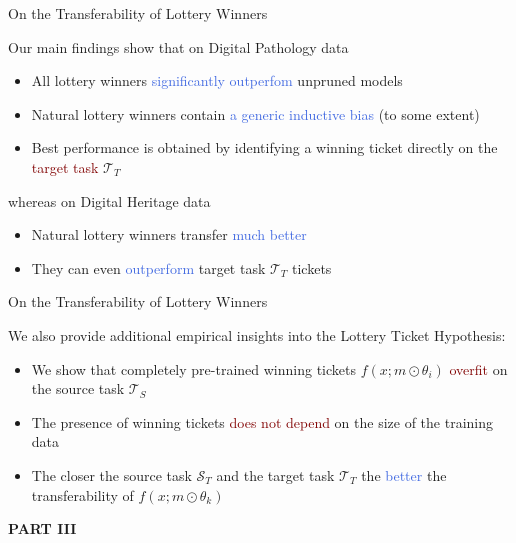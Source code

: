 \documentclass{beamer}
\begin{document}
\begin{frame}{On the Transferability of Lottery Winners}

	Our main findings show that on Digital Pathology data
	\bigskip
	\begin{itemize}
		\item All lottery winners \textcolor{RoyalBlue}{significantly outperfom} unpruned models 
		\item Natural lottery winners contain \textcolor{RoyalBlue}{a generic inductive bias} (to some extent)
		\item Best performance is obtained by identifying a winning ticket directly on the \textcolor{Maroon}{target task} $\mathcal{T}_T$
	\end{itemize}
	\bigskip

	whereas on Digital Heritage data
	\bigskip
	\begin{itemize}
		\item Natural lottery winners transfer \textcolor{RoyalBlue}{much better}
		\item They can even \textcolor{RoyalBlue}{outperform} target task $\mathcal{T}_T$ tickets
	\end{itemize}
\end{frame}

\begin{frame}{On the Transferability of Lottery Winners}
	
	We also provide additional empirical insights into the Lottery Ticket Hypothesis:
	\bigskip
	\begin{itemize}
		\item We show that completely pre-trained winning tickets $f(x;m \odot \theta_i)$ \textcolor{Maroon}{overfit} on the source task $\mathcal{T}_S$ 
		\item The presence of winning tickets \textcolor{Maroon}{does not depend} on the size of the training data
		\item The closer the source task $\mathcal{S}_T$ and the target task $\mathcal{T}_T$ the \textcolor{RoyalBlue}{better} the transferability of $f(x;m \odot \theta_k)$
	\end{itemize}

\end{frame}


\begin{frame}
	\begin{center}
		\textcolor{skymagenta}{\textbf{PART III}}
	\end{center}
\end{frame}
\end{document}
